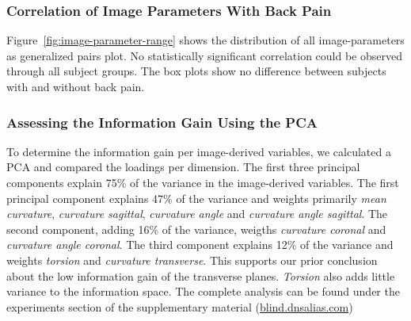 \documentclass[a4paper,twoside]{style/article}
\begin{document}
\subsubsection{Correlation of Image Parameters With Back Pain}
Figure~\ref{fig:image-parameter-range} shows the distribution of all image-parameters as generalized pairs plot.
No statistically significant correlation could be observed through all subject groups.
The box plots show no difference between subjects with and without back pain.

\subsubsection{Assessing the Information Gain Using the PCA}
To determine the information gain per image-derived variables, we calculated a PCA and compared the loadings per dimension.
The first three principal components explain 75\% of the variance in the image-derived variables.
The first principal component explains 47\% of the variance and weights primarily \emph{mean curvature}, \emph{curvature sagittal}, \emph{curvature angle} and \emph{curvature angle sagittal}.
The second component, adding 16\% of the variance, weigths  \emph{curvature coronal} and \emph{curvature angle coronal}.
The third component explains 12\% of the variance and weights \emph{torsion} and \emph{curvature transverse}.
This supports our prior conclusion about the low information gain of the transverse planes.
\emph{Torsion} also adds little variance to the information space.
The complete analysis can be found under the experiments section of the supplementary material (\url{blind.dnsalias.com})
\end{document}

